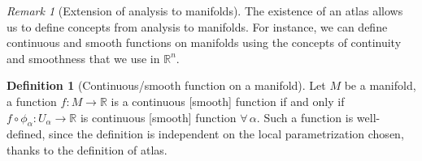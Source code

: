 \documentclass[a4paper,11pt,titlepage]{article}
\numberwithin{equation}{section}
\theoremstyle{definition}
\newtheorem{definition}[theorem]{Definition}
\theoremstyle{remark}
\newtheorem{remark}[theorem]{Remark}
\newcommand{\rfield}{\mathbb{R}}
\begin{document}
\begin{remark}[Extension of analysis to manifolds]
  The existence of an atlas allows us to define concepts from analysis to manifolds. For instance, we can define continuous and smooth functions on manifolds using the concepts of continuity and smoothness that we use in $\rfield^n$.
\end{remark}

\begin{definition}[Continuous/smooth function on a manifold]
  Let $M$ be a manifold, a function $f \colon M \rightarrow \rfield$ is a continuous [smooth] function if and only if $f \circ \phi_{\alpha} \colon U_{\alpha} \rightarrow \rfield$ is continuous [smooth] function $\forall \, \alpha$. Such a function is well-defined, since the definition is independent on the local parametrization chosen, thanks to the definition of atlas.
\end{definition}
\end{document}
